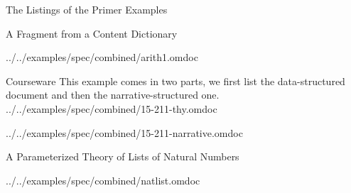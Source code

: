 \begin{tchapter}[id=examples]{The Listings of the Primer Examples}
\begin{tsection}[id=examples:arith1]{A Fragment from a Content Dictionary}

  {../../examples/spec/combined/arith1.omdoc}
\end{tsection}

\begin{tsection}[id=examples:courseware]{Courseware}
This example comes in two parts, we first list the data-structured document and
then the narrative-structured one.
 {../../examples/spec/combined/15-211-thy.omdoc}


  {../../examples/spec/combined/15-211-narrative.omdoc}
\end{tsection}

\begin{tsection}[id=examples:natlist,short=Lists of Natural Numbers]{A Parameterized Theory of Lists of Natural Numbers}

  {../../examples/spec/combined/natlist.omdoc}
\end{tsection}
\end{tchapter}

